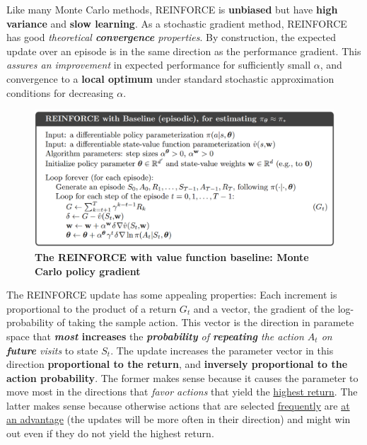 \documentclass[11pt]{article}
\begin{document}
Like many Monte Carlo methods, REINFORCE is \textbf{unbiased} but have \textbf{high variance} and \textbf{slow learning}. As a stochastic gradient method, REINFORCE has good \emph{theoretical \textbf{convergence} properties}. By construction, the expected update over an episode is in the same direction as the performance gradient. This \emph{assures an improvement} in expected performance for sufficiently small $\alpha$, and convergence to a \textbf{local optimum} under standard stochastic approximation conditions for decreasing $\alpha$.  

\begin{figure}
\begin{minipage}[t]{1\linewidth}
  \centering
  \centerline{\includegraphics[scale = 0.3]{reinforce_baseline_algo.png}}
\end{minipage}
\caption{\footnotesize{\textbf{The REINFORCE with value function baseline: Monte Carlo policy gradient}}}
\label{fig: reinforce_baseline_algo}
\end{figure}

The REINFORCE update has some appealing properties: Each increment is proportional to the product of a return $G_t$ and a vector, the gradient of the log-probability of taking the sample action. This vector is the direction in paramete space that \textbf{\emph{most} increases} the \emph{\textbf{probability} of \textbf{repeating} the action $A_t$ on \textbf{future} visits} to state $S_t$. The update increases the parameter vector in this direction \textbf{proportional to the return}, and \textbf{inversely proportional to the action probability}. The former makes sense because it causes the parameter to move most in the directions that \emph{favor actions}
that yield the \underline{highest return}. The latter makes sense because otherwise actions that are selected \underline{frequently} are \underline{at an advantage} (the updates will be more often in their direction) and might win out even if they do not yield the highest return.
\end{document}
